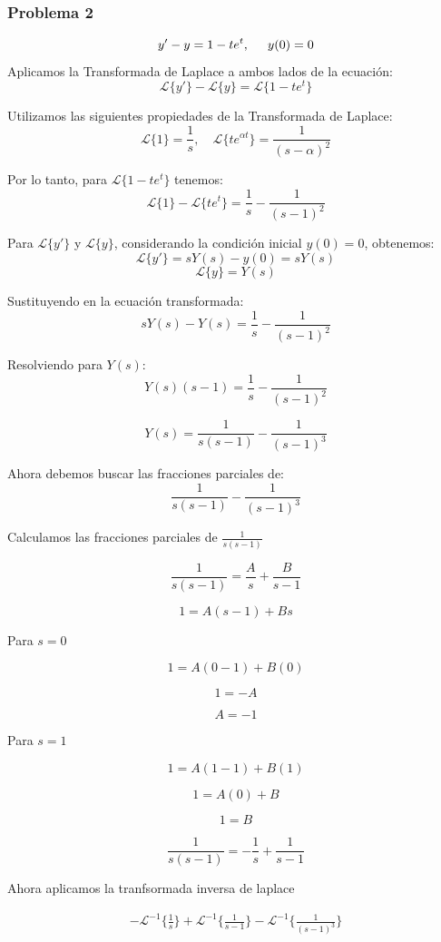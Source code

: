 \documentclass{article}
\begin{document}
\subsubsection{Problema 2}
\[y' - y = 1 - te^{t}, \hspace{.5cm} y(0) = 0\]
Aplicamos la Transformada de Laplace a ambos lados de la ecuación:
\[\mathcal{L}\{y'\} - \mathcal{L}\{y\} = \mathcal{L}\{1 - te^{t}\}\]

Utilizamos las siguientes propiedades de la Transformada de Laplace:
\[
    \mathcal{L}\{1\} = \frac{1}{s}, \quad \mathcal{L}\{te^{\alpha t}\} = \frac{1}{(s - \alpha)^2}
\]

Por lo tanto, para \(\mathcal{L}\{1 - te^{t}\}\) tenemos:
\[
    \mathcal{L}\{1\} - \mathcal{L}\{te^{t}\} = \frac{1}{s} - \frac{1}{(s-1)^2}
\]

Para \(\mathcal{L}\{y'\}\) y \(\mathcal{L}\{y\}\), considerando la condición inicial \(y(0) = 0\), obtenemos:
\[
    \mathcal{L}\{y'\} = sY(s) - y(0) = sY(s)
\]
\[
    \mathcal{L}\{y\} = Y(s)
\]

Sustituyendo en la ecuación transformada:
\[
    sY(s) - Y(s) = \frac{1}{s} - \frac{1}{(s-1)^2}
\]

Resolviendo para \(Y(s)\):
\[
    Y(s)(s - 1) = \frac{1}{s} - \frac{1}{(s-1)^2}
\]

\[
    Y(s) = \frac{1}{s(s - 1)} - \frac{1}{(s-1)^3}
\]

Ahora debemos buscar las fracciones parciales de:
\[
    \frac{1}{s(s - 1)} - \frac{1}{(s-1)^3}
\]

Calculamos las fracciones parciales de $\frac{1}{s(s - 1)}$

\[ \frac{1}{s(s - 1)} = \frac{A}{s} + \frac{B}{s-1}\]

\[ 1 = A(s-1) + Bs\]

Para $s=0$

\[ 1 = A(0-1) + B(0)\]

\[ 1 = -A\]

\[A = -1\]

Para $s=1$

\[ 1 = A(1-1) + B(1)\]

\[ 1 = A(0) + B\]

\[ 1 = B\]

\[ \frac{1}{s(s - 1)} = -\frac{1}{s} + \frac{1}{s-1}\]

Ahora aplicamos la tranfsormada inversa de laplace

\begin{align*}
    -\mathcal{L}^{-1}\{\frac{1}{s}\} +  \mathcal{L}^{-1}\{\frac{1}{s-1}\} - \mathcal{L}^{-1}\{\frac{1}{(s-1)^3}\}
\end{align*}
\end{document}

